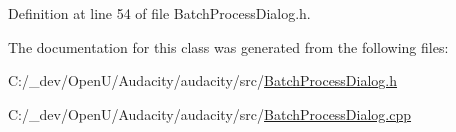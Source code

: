 Definition at line 54 of file Batch\+Process\+Dialog.\+h.



The documentation for this class was generated from the following files\+:\begin{DoxyCompactItemize}
\item 
C\+:/\+\_\+dev/\+Open\+U/\+Audacity/audacity/src/\hyperlink{_batch_process_dialog_8h}{Batch\+Process\+Dialog.\+h}\item 
C\+:/\+\_\+dev/\+Open\+U/\+Audacity/audacity/src/\hyperlink{_batch_process_dialog_8cpp}{Batch\+Process\+Dialog.\+cpp}\end{DoxyCompactItemize}
